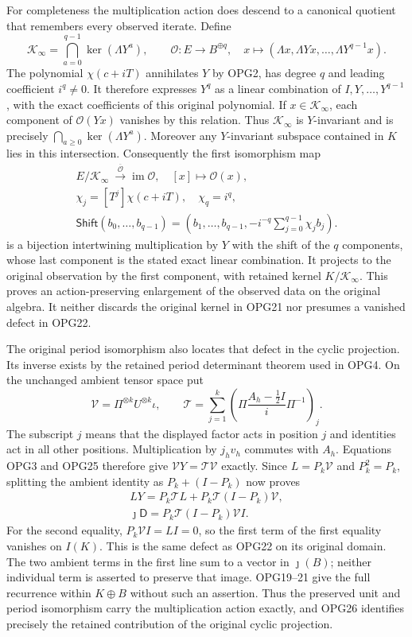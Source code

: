 \documentclass[11pt,a4paper]{article}
\begin{document}
For completeness the multiplication action does descend to a
canonical quotient that remembers every observed iterate. Define
\[
 \mathcal K_\infty=\bigcap_{a=0}^{q-1}\ker(\Lambda Y^a),\qquad
 \mathcal O:E\to B^{\oplus q},\quad
 x\longmapsto(\Lambda x,\Lambda Yx,\ldots,\Lambda Y^{q-1}x).
 \tag{OPG23}
\]
The polynomial $\chi(c+iT)$ annihilates $Y$ by OPG2, has degree
$q$ and leading coefficient $i^q\ne0$. It therefore expresses
$Y^q$ as a linear combination of $I,Y,\ldots,Y^{q-1}$, with
the exact coefficients of this original polynomial. If
$x\in\mathcal K_\infty$, each component of $\mathcal O(Yx)$
vanishes by this relation. Thus $\mathcal K_\infty$ is
$Y$-invariant and is precisely $\bigcap_{a\geq0}\ker(\Lambda Y^a)$.
Moreover any $Y$-invariant subspace contained in $K$ lies in
this intersection. Consequently the first isomorphism map
\[
\begin{gathered}
 E/\mathcal K_\infty\ \xrightarrow{\ \overline{\mathcal O}\ }
 \operatorname{im}\mathcal O,\quad[x]\longmapsto\mathcal O(x),\\
 \chi_j=[T^j]\chi(c+iT),\quad\chi_q=i^q,\\
 \mathsf{Shift}(b_0,\ldots,b_{q-1})=
 \left(b_1,\ldots,b_{q-1},-i^{-q}\sum_{j=0}^{q-1}\chi_j b_j\right).
\end{gathered}
 \tag{OPG24}
\]
is a bijection intertwining multiplication by $Y$ with the shift
of the $q$ components, whose last component is the stated exact
linear combination. It projects to the original observation by
the first component, with retained kernel $K/\mathcal K_\infty$.
This proves an action-preserving enlargement of the observed
data on the original algebra. It neither discards the original
kernel in OPG21 nor presumes a vanished defect in OPG22.

The original period isomorphism also locates that defect in the
cyclic projection. Its inverse exists by the retained period
determinant theorem used in OPG4. On the unchanged ambient tensor
space put
\[
 \mathcal V=\Pi^{\otimes k}U^{\otimes k}\iota,
 \qquad
 \mathcal T=\sum_{j=1}^k
 \left(\Pi\frac{A_h-\tfrac12I}{i}\Pi^{-1}\right)_j.
 \tag{OPG25}
\]
The subscript $j$ means that the displayed factor acts in position
$j$ and identities act in all other positions. Multiplication by
$j_hv_h$ commutes with $A_h$. Equations OPG3 and OPG25 therefore
give $\mathcal VY=\mathcal T\mathcal V$ exactly. Since
$L=P_k\mathcal V$ and $P_k^2=P_k$, splitting the ambient identity
as $P_k+(I-P_k)$ now proves
\[
\begin{gathered}
 LY=P_k\mathcal T L+P_k\mathcal T(I-P_k)\mathcal V,\\
 \jmath\mathsf D=P_k\mathcal T(I-P_k)\mathcal V I.
\end{gathered}\tag{OPG26}
\]
For the second equality, $P_k\mathcal V I=LI=0$, so the
first term of the first equality vanishes on $I(K)$. This is
the same defect as OPG22 on its original domain. The two ambient
terms in the first line sum to a vector in $\jmath(B)$; neither
individual term is asserted to preserve that image. OPG19--21
give the full recurrence within $K\oplus B$ without such an
assertion. Thus the preserved unit and period isomorphism carry
the multiplication action exactly, and OPG26 identifies precisely
the retained contribution of the original cyclic projection.
\end{document}
